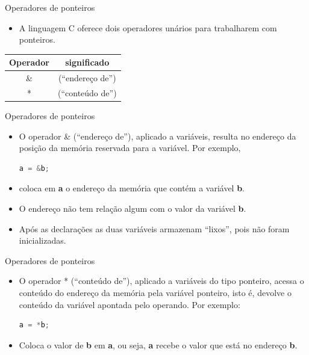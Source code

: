\begin{frame}[fragile,c]{Operadores de ponteiros}
  \begin{itemize}
    \item A linguagem C oferece dois operadores unários para trabalharem com ponteiros.
  \end{itemize}
  \begin{table}
     \begin{tabular}{c|c}
     \hline Operador & significado\\
      \hline \& & (``endereço de'')\\      
      \hline * & (``conteúdo de'')\\
      \hline 
     \end{tabular}
  \end{table}   
\end{frame}

\begin{frame}[fragile,c]{Operadores de ponteiros}
  \begin{itemize}[<+->]
     \item O operador \& (``endereço de''), aplicado a variáveis, resulta no \alert{endereço da posição da memória} reservada para a variável. Por exemplo,
     \begin{lstlisting}[language=C]
       a = &b;     
     \end{lstlisting}
      \item coloca em \textbf{a} o endereço da memória que contém a variável \textbf{b}.
    \item O endereço não tem relação algum com o valor da variável \textbf{b}.    
      \item Após as declarações as duas variáveis armazenam  ``lixos'', pois não foram inicializadas.
 \end{itemize}  
\end{frame}

\begin{frame}[fragile,c]{Operadores de ponteiros}
  \begin{itemize}[<+->]
    \item O operador * (``conteúdo de''), aplicado a variáveis do \alert{tipo ponteiro}, acessa o \alert{conteúdo do endereço da memória} pela variável ponteiro, isto é, devolve o conteúdo da variável apontada pelo operando. Por exemplo:
    \begin{lstlisting}[language=C]
       a = *b;
    \end{lstlisting}
    \item Coloca o valor de \textbf{b} em \textbf{a}, ou seja, \textbf{a} recebe o valor que está no endereço \textbf{b}.
  \end{itemize}
\end{frame}

